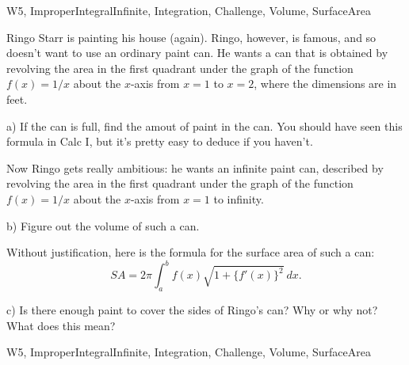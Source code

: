 \begin{tagblock}{W5, ImproperIntegralInfinite, Integration, Challenge, Volume, SurfaceArea}
\begin{question}
	
Ringo Starr is painting his house (again). Ringo, however, is famous, and so doesn't want to use an ordinary paint can. He wants a can that is obtained by revolving the area in the first quadrant under the graph of the function $f(x)=1/x$ about the $x$-axis from $x=1$ to $x=2$, where the dimensions are in feet. 

\bigskip

a) If the can is full, find the amout of paint in the can. You should have seen this formula in Calc I, but it's pretty easy to deduce if you haven't.


\bigskip

Now Ringo gets really ambitious: he wants an infinite paint can, described by revolving the area in the first quadrant under the graph of the function $f(x)=1/x$ about the $x$-axis from $x=1$ to infinity. 

\bigskip

b) Figure out the volume of such a can.

\bigskip

Without justification, here is the formula for the surface area of such a can:
\[
SA=2\pi\int_a^bf(x)\sqrt{1+\{f'(x)\}^2} \ dx.
\]

\bigskip

c) Is there enough paint to cover the sides of Ringo's can? Why or why not? What does this mean?

    
\begin{tags}
        W5, ImproperIntegralInfinite, Integration, Challenge, Volume, SurfaceArea
\end{tags}
    
\begin{diary}
        
\end{diary}
	
\begin{solution}

\end{solution}
	
\end{question}

\end{tagblock}

